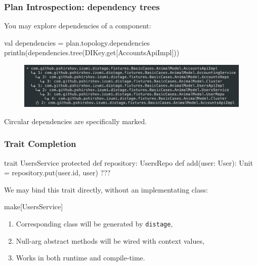 \documentclass[usenames,dvipsnames]{beamer}
\newcommand{\distage}{\texttt{distage}\xspace}
\begin{document}
\begin{frame}[fragile]
\frametitle{Plan Introspection: dependency trees}
You may explore dependencies of a component:

\begin{scalacode}
val dependencies = plan.topology.dependencies
println(dependencies.tree(DIKey.get[AccountsApiImpl]))
\end{scalacode}

\begin{figure}
    \includegraphics[width=\textwidth]{media/dependency-tree.png}
\end{figure}

Circular dependencies are specifically marked.
\end{frame}

\begin{frame}[fragile]
\frametitle{Trait Completion}
\begin{scalacode}
trait UsersService {
  protected def repository: UsersRepo
  def add(user: User): Unit = { 
    repository.put(user.id, user)
    ???
  }
}
\end{scalacode}
We may bind this trait directly, without an implementating class:

\begin{scalacode}
make[UsersService]
\end{scalacode}

\begin{enumerate}
\item Corresponding class will be generated by \distage,
\item Null-arg abstract methods will be wired with context values,
\item Works in both runtime and compile-time.
\end{enumerate}
\end{frame}
\end{document}
